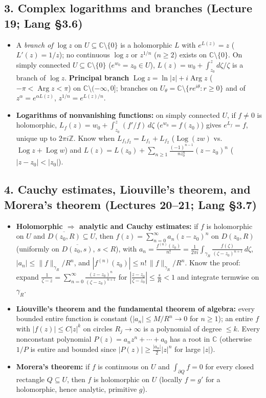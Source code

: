 \documentclass[12pt, reqno]{amsart}
\theoremstyle{definition}
\numberwithin{equation}{subsection}
\DeclareMathOperator{\Log}{Log}
\DeclareMathOperator{\Arg}{Arg}
\newcommand{\C}{\mathbb{C}}
\newcommand{\zee}{\mathbb{Z}}
\newcommand{\ov}[1]{\overline{#1}}
\begin{document}
\subsection*{3. Complex logarithms and branches \normalfont (Lecture 19; Lang \S3.6)}
\begin{itemize}[leftmargin=*]
\item A \emph{branch of $\log z$} on $U\subseteq\C\setminus\{0\}$ is a holomorphic $L$ with $e^{L(z)}=z$ ($L'(z)=1/z$);
      no continuous $\log z$ or $z^{1/n}$ ($n\ge2$) exists on $\C\setminus\{0\}$.
      On simply connected $U\subseteq\C\setminus\{0\}$ ($e^{w_0}=z_0\in U$), $L(z)=w_0+\int_{z_0}^z d\zeta/\zeta$ is a branch of $\log z$.
      \textbf{Principal branch} $\Log z=\ln|z|+i\Arg z$ ($-\pi<\Arg z<\pi$) on $\C\setminus(-\infty,0]$; branches on
      $U_\theta=\C\setminus\{re^{i\theta}:r\ge0\}$ and of $z^\alpha=e^{\alpha L(z)}$, $z^{1/n}=e^{L(z)/n}$.
\item \textbf{Logarithms of nonvanishing functions:} on simply connected $U$, if $f\ne0$ is holomorphic,
      $L_f(z)=w_0+\int_{z_0}^z(f'/f)\,d\zeta$ ($e^{w_0}=f(z_0)$) gives $e^{L_f}=f$, unique up to $2\pi i\zee$.
      Know when $L_{f_1f_2}=L_{f_1}+L_{f_2}$ ($\Log(zw)$ vs.\ $\Log z+\Log w$) and $L(z)=L(z_0)+\sum_{n\ge1}\frac{(-1)^{n-1}}{nz_0^n}(z-z_0)^n$ ($|z-z_0|<|z_0|$).
\end{itemize}

\subsection*{4. Cauchy estimates, Liouville's theorem, and Morera's theorem \normalfont (Lectures 20--21; Lang \S3.7)}
\begin{itemize}[leftmargin=*]
\item \textbf{Holomorphic $\Rightarrow$ analytic and Cauchy estimates:} if $f$ is holomorphic on $U$ and $\ov{D(z_0,R)}\subseteq U$, then
      $f(z)=\sum_{n=0}^\infty a_n(z-z_0)^n$ on $D(z_0,R)$ (uniformly on $\ov{D(z_0,s)}$, $s<R$), with
      $a_n=\frac{f^{(n)}(z_0)}{n!}=\frac{1}{2\pi i}\int_{\gamma_R}\frac{f(\zeta)}{(\zeta-z_0)^{n+1}}\,d\zeta$,
      $|a_n|\le\|f\|_{\gamma_R}/R^n$, and $|f^{(n)}(z_0)|\le n!\,\|f\|_{\gamma_R}/R^n$.
      Know the proof: expand $\frac{1}{\zeta-z}=\sum_{n=0}^\infty\frac{(z-z_0)^n}{(\zeta-z_0)^{n+1}}$ for $|\frac{z-z_0}{\zeta-z_0}|\le\frac sR<1$
      and integrate termwise on $\gamma_R$.
\item \textbf{Liouville's theorem and the fundamental theorem of algebra:} every bounded entire function is constant ($|a_n|\le M/R^n\to0$ for $n\ge1$);
      an entire $f$ with $|f(z)|\le C|z|^k$ on circles $R_j\to\infty$ is a polynomial of degree $\le k$.
      Every nonconstant polynomial $P(z)=a_nz^n+\cdots+a_0$ has a root in $\C$ (otherwise $1/P$ is entire and bounded since $|P(z)|\ge\frac{|a_n|}{2}|z|^n$ for large $|z|$).
\item \textbf{Morera's theorem:} if $f$ is continuous on $U$ and $\int_{\partial Q}f=0$ for every closed rectangle $Q\subseteq U$,
      then $f$ is holomorphic on $U$ (locally $f=g'$ for a holomorphic, hence analytic, primitive $g$).
\end{itemize}
\end{document}
